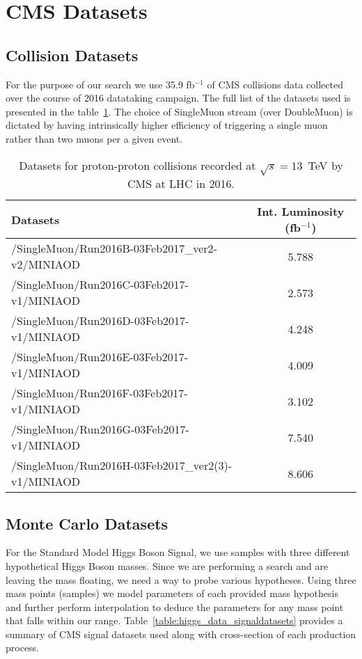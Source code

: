 \section{CMS Datasets} \label{section:higgs_data}

\subsection{Collision Datasets}
For the purpose of our search we use 35.9 fb$^{-1}$ of CMS collisions data collected over the course of 2016 datataking campaign. The full list of the datasets used is presented in the table~\ref{table:higgs_data_collisiondatasets}. The choice of SingleMuon stream (over DoubleMuon) is dictated by having intrinsically higher efficiency of triggering a single muon rather than two muons per a given event.

\begin{table}
    \caption{Datasets for proton-proton collisions recorded at $\sqrt{s}=13$~TeV by CMS at LHC in 2016.}
    \label{table:higgs_data_collisiondatasets}
    \begin{center}
        \begin{tabular}{ l  c}
            \hline
            Datasets & Int. Luminosity (fb$^{-1}$)\\
            \hline
            {/SingleMuon/Run2016B-03Feb2017\_ver2-v2/MINIAOD} & 5.788\\
            {/SingleMuon/Run2016C-03Feb2017-v1/MINIAOD} & 2.573\\
            {/SingleMuon/Run2016D-03Feb2017-v1/MINIAOD} & 4.248\\
            {/SingleMuon/Run2016E-03Feb2017-v1/MINIAOD} & 4.009\\
            {/SingleMuon/Run2016F-03Feb2017-v1/MINIAOD} & 3.102\\
            {/SingleMuon/Run2016G-03Feb2017-v1/MINIAOD} & 7.540\\
            {/SingleMuon/Run2016H-03Feb2017\_ver2(3)-v1/MINIAOD} & 8.606\\
            \hline
        \end{tabular}
    \end{center}
\end{table}

\subsection{Monte Carlo Datasets}
For the Standard Model Higgs Boson Signal, we use samples with three different hypothetical Higgs Boson masses. Since we are performing a search and are leaving the mass floating, we need a way to probe various hypotheses. Using three mass points (samples) we model parameters of each provided mass hypothesis and further perform interpolation to deduce the parameters for any mass point that falls within our range. Table~\ref{table:higgs_data_signaldatasets} provides a summary of CMS signal datasets used along with cross-section of each production process.

